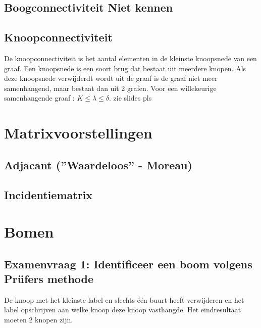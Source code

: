 \documentclass[12pt]{report}
\newcommand{\important}[1] {\textbf{\color{orange}#1}}
\begin{document}
\subsection{Boogconnectiviteit \important{Niet kennen}}
\subsection{Knoopconnectiviteit}
De knoopconnectiviteit is het aantal elementen in de kleinste knoopsnede van een graaf. Een knoopsnede is een soort brug dat bestaat uit meerdere knopen.
Als deze knoopsnede verwijderdt wordt uit de graaf is de graaf niet meer samenhangend, maar bestaat dan uit 2 grafen.
Voor een willekeurige samenhangende graaf : $K \leq \lambda \leq \delta$. zie slides pls

\section{Matrixvoorstellingen}
\subsection{Adjacant (\important{''Waardeloos'' - Moreau})}
\subsection{Incidentiematrix}
\section{Bomen}
\subsection{Examenvraag 1: \important{Identificeer een boom volgens Prüfers methode}}
De knoop met het kleinste label en slechts één buurt heeft verwijderen en het label opschrijven aan welke knoop deze knoop vasthangde.
Het eindresultaat moeten 2 knopen zijn.
\end{document}
